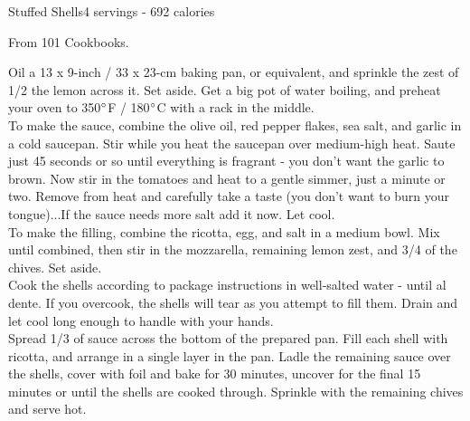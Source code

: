 \begin{recipe}{Stuffed Shells}{4 servings - 692 calories}{}

\freeform From 101 Cookbooks.


Oil a 13 x 9-inch / 33 x 23-cm baking pan, or equivalent, and sprinkle the zest of 1/2 the lemon across it. Set aside. Get a big pot of water boiling, and preheat your oven to 350$\degree$F / 180$\degree$C with a rack in the middle.\\

To make the sauce, combine the olive oil, red pepper flakes, sea salt, and garlic in a cold saucepan. Stir while you heat the saucepan over medium-high heat. Saute just 45 seconds or so until everything is fragrant - you don't want the garlic to brown. Now stir in the tomatoes and heat to a gentle simmer, just a minute or two. Remove from heat and carefully take a taste (you don't want to burn your tongue)...If the sauce needs more salt add it now. Let cool.\\

To make the filling, combine the ricotta, egg, and salt in a medium bowl. Mix until combined, then stir in the mozzarella, remaining lemon zest, and 3/4 of the chives. Set aside.\\

Cook the shells according to package instructions in well-salted water - until al dente. If you overcook, the shells will tear as you attempt to fill them. Drain and let cool long enough to handle with your hands.\\

Spread 1/3 of sauce across the bottom of the prepared pan. Fill each shell with ricotta, and arrange in a single layer in the pan. Ladle the remaining sauce over the shells, cover with foil and bake for 30 minutes, uncover for the final 15 minutes or until the shells are cooked through. Sprinkle with the remaining chives and serve hot.

\end{recipe}
